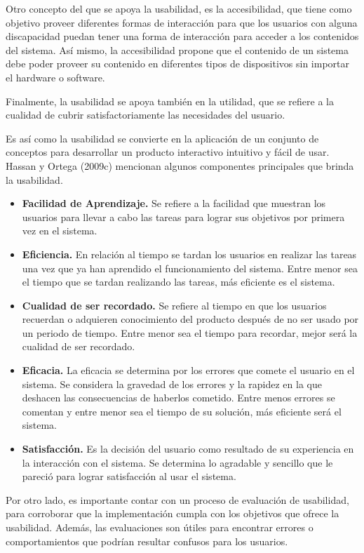 Otro concepto del que se apoya la usabilidad, es la accesibilidad, que tiene como objetivo proveer diferentes formas de interacción para que los usuarios con alguna discapacidad puedan tener una forma de interacción para acceder a los contenidos del sistema. Así mismo, la accesibilidad propone que el contenido de un sistema debe poder proveer su contenido en diferentes tipos de dispositivos sin importar el hardware o software.

Finalmente, la usabilidad se apoya también en la utilidad, que se refiere a la cualidad de cubrir satisfactoriamente las necesidades del usuario.

Es así como la usabilidad se convierte en la aplicación de un conjunto de conceptos para desarrollar un producto interactivo intuitivo y fácil de usar. Hassan y Ortega (2009c) mencionan algunos componentes principales que brinda la usabilidad.

\begin{itemize}
  \item \textbf{Facilidad de Aprendizaje.} Se refiere a la facilidad que muestran los usuarios para llevar a cabo las tareas para lograr sus objetivos por primera vez en el sistema.
  \item \textbf{Eficiencia.} En relación al tiempo se tardan los usuarios en realizar las tareas una vez que ya han aprendido el funcionamiento del sistema. Entre menor sea el tiempo que se tardan realizando las tareas, más eficiente es el sistema.
  \item \textbf{Cualidad de ser recordado.} Se refiere al tiempo en que los usuarios recuerdan o adquieren conocimiento del producto después de no ser usado por un periodo de tiempo. Entre menor sea el tiempo para recordar, mejor será la cualidad de ser recordado.
  \item \textbf{Eficacia.} La eficacia se determina por los errores que comete el usuario en el sistema. Se considera la gravedad de los errores y la rapidez en la que deshacen las consecuencias de haberlos cometido. Entre menos errores se comentan y entre menor sea el tiempo de su solución, más eficiente será el sistema.
  \item \textbf{Satisfacción.} Es la decisión del usuario como resultado de su experiencia en la interacción con el sistema. Se determina lo agradable y sencillo que le pareció para lograr satisfacción al usar el sistema.
\end{itemize}

Por otro lado, es importante contar con un proceso de evaluación de usabilidad, para corroborar que la implementación cumpla con los objetivos que ofrece la usabilidad. Además, las evaluaciones son útiles para encontrar errores o comportamientos que podrían resultar confusos para los usuarios.


